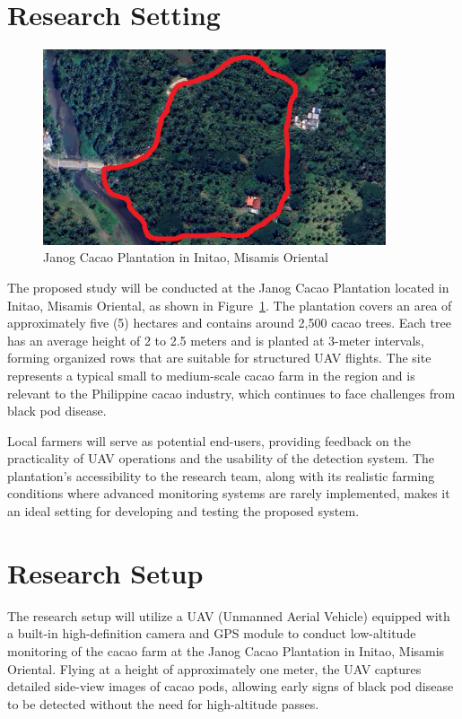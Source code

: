 \section{Research Setting}

\begin{figure}[H]
	\centering
	\caption{Janog Cacao Plantation in Initao, Misamis Oriental}
	\label{fig:cacao_farm}
	\includegraphics[width=0.9\textwidth]{figures/Cacao_Farm.pdf}
\end{figure}

The proposed study will be conducted at the Janog Cacao Plantation located in Initao, Misamis Oriental, as shown in Figure~\ref{fig:cacao_farm}. The plantation covers an area of approximately five (5) hectares and contains around 2,500 cacao trees. Each tree has an average height of 2 to 2.5 meters and is planted at 3-meter intervals, forming organized rows that are suitable for structured UAV flights. The site represents a typical small to medium-scale cacao farm in the region and is relevant to the Philippine cacao industry, which continues to face challenges from black pod disease.

Local farmers will serve as potential end-users, providing feedback on the practicality of UAV operations and the usability of the detection system. The plantation’s accessibility to the research team, along with its realistic farming conditions where advanced monitoring systems are rarely implemented, makes it an ideal setting for developing and testing the proposed system.


\section{Research Setup}

The research setup will utilize a UAV (Unmanned Aerial Vehicle) equipped with a built-in high-definition camera and GPS module to conduct low-altitude monitoring of the cacao farm at the Janog Cacao Plantation in Initao, Misamis Oriental. Flying at a height of approximately one meter, the UAV captures detailed side-view images of cacao pods, allowing early signs of black pod disease to be detected without the need for high-altitude passes.


